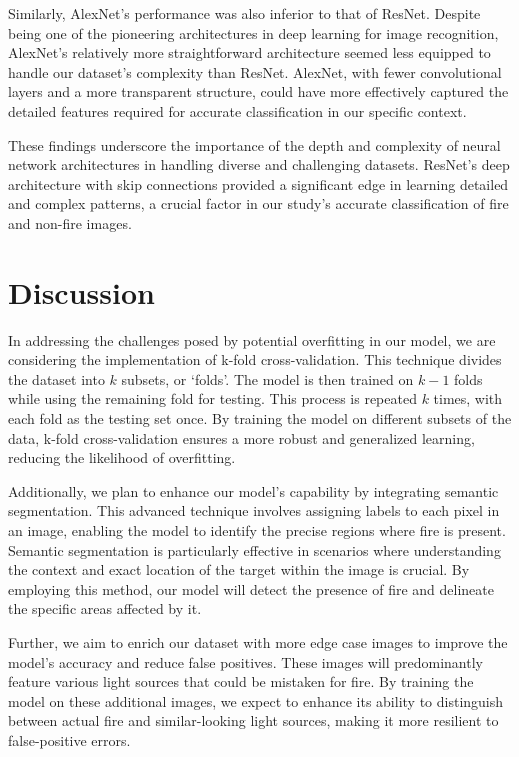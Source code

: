 Similarly, AlexNet's performance was also inferior to that of ResNet. Despite being one of the pioneering architectures in deep learning for image recognition, AlexNet's relatively more straightforward architecture seemed less equipped to handle our dataset's complexity than ResNet. AlexNet, with fewer convolutional layers and a more transparent structure, could have more effectively captured the detailed features required for accurate classification in our specific context.

These findings underscore the importance of the depth and complexity of neural network architectures in handling diverse and challenging datasets. ResNet's deep architecture with skip connections provided a significant edge in learning detailed and complex patterns, a crucial factor in our study's accurate classification of fire and non-fire images.


\section{Discussion}

In addressing the challenges posed by potential overfitting in our model, we are considering the implementation of k-fold cross-validation. This technique divides the dataset into \(k\) subsets, or `folds'. The model is then trained on \(k-1\) folds while using the remaining fold for testing. This process is repeated \(k\) times, with each fold as the testing set once. By training the model on different subsets of the data, k-fold cross-validation ensures a more robust and generalized learning, reducing the likelihood of overfitting.

Additionally, we plan to enhance our model's capability by integrating semantic segmentation. This advanced technique involves assigning labels to each pixel in an image, enabling the model to identify the precise regions where fire is present. Semantic segmentation is particularly effective in scenarios where understanding the context and exact location of the target within the image is crucial. By employing this method, our model will detect the presence of fire and delineate the specific areas affected by it.

Further, we aim to enrich our dataset with more edge case images to improve the model's accuracy and reduce false positives. These images will predominantly feature various light sources that could be mistaken for fire. By training the model on these additional images, we expect to enhance its ability to distinguish between actual fire and similar-looking light sources, making it more resilient to false-positive errors.

